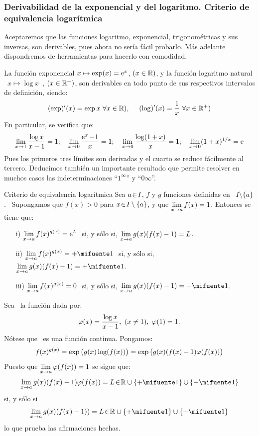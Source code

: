 \subsubsection{Derivabilidad de la exponencial y del logaritmo. Criterio de equivalencia
logarítmica}

Aceptaremos que las funciones logaritmo, exponencial, trigonométricas
y sus inversas, son derivables, pues ahora no sería fácil probarlo.
Más adelante dispondremos de herramientas para hacerlo con comodidad.

La función exponencial $x\mapsto\exp(x)=\operatorname{e}^{x}$, $(x\in\mathbb R)$, y la
función logaritmo natural %
\mbox{%
$x\mapsto\log x$%
}, $(x\in\mathbb R^{+})$, son derivables en todo punto de sus respectivos
intervalos de definición, siendo: 
\[
(\exp)^{\prime}(x)=\exp x\ \forall x\in\mathbb R),\ \ \ \ (\log)^{\prime}(x)=\frac{1}{x}\ \forall x\in\mathbb R^{+})
\]
En particular, se verifica que: 
\[
\displaystyle{\lim_{x\to1}\frac{\log x}{x-1}=1;\quad\lim_{x\to0}\frac{\operatorname{e}^{x}-1}{x}=1;\quad\lim_{x\to0}\frac{\log(1+x)}{x}=1;\quad\lim_{x\to0}(1+x)^{1/x}=\operatorname{e}}
\]
Pues los primeros tres límites son derivadas y el cuarto se reduce
fácilmente al tercero. Deducimos también un importante resultado que
permite resolver en muchos casos las indeterminaciones ``$1^{\infty}$''
y ``$0\infty$''.

\begin{teo}{Criterio de equivalencia logarítmica}{}\label{zapato}
Sea $a\!\in\! I$, $f$ y $g$ funciones definidas en %
\mbox{%
$I\setminus\{a\}$.%
} Supongamos que $f(x)>0$ para $x\!\in\! I\setminus\{a\}$, y que $\displaystyle\lim_{x\to a}f(x)=1$.
Entonces se tiene que: 
\begin{itemize}
\item[i)] $\displaystyle\lim_{x\to a}f(x)^{g(x)}=\operatorname{e}^{L}\ $ si, y sólo si, $\displaystyle\lim_{x\to a}g(x)(f(x)-1)=L$. 
\item[ii)] $\dis\lim_{x\to a}f(x)^{g(x)}=+\infinity\ $ si, y sólo si, $\dis\lim_{x\to a}g(x)(f(x)-1)=+\infinity$. 
\item[iii)] $\displaystyle\lim_{x\to a}f(x)^{g(x)}=0\ $ si, y sólo si, $\dis\lim_{x\to a}g(x)(f(x)-1)=-\infinity$. 
\end{itemize}
\end{teo} \dem Sea \func{\ff}{\Rp}\ la función dada por:
\[
\ff(x)=\frac{\log x}{x-1},\ (x\neq1),\ \ff(1)=1.
\]
Nótese que \ff\ es una función continua. Pongamos: 
\[
f(x)^{g(x)}=\exp\big(g(x)\log(f(x))\big)=\exp\big(g(x)(f(x)-1)\varphi(f(x))\big)
\]
Puesto que $\displaystyle\lim_{x\to a}\varphi(f(x))=1$ se sigue que: 
\[
\lim_{x\to a}g(x)(f(x)-1)\ff(f(x))=L\en\R\cup\{+\infinity\}\cup\{-\infinity\}
\]
si, y sólo si 
\[
\lim_{x\to a}g(x)(f(x)-1))=L\en\R\cup\{+\infinity\}\cup\{-\infinity\}
\]
lo que prueba las afirmaciones hechas.\fin

